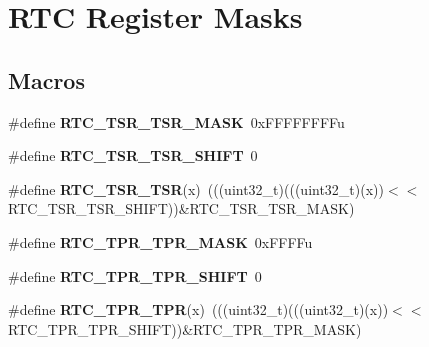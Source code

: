 \hypertarget{group___r_t_c___register___masks}{}\section{R\+TC Register Masks}
\label{group___r_t_c___register___masks}
\subsection*{Macros}
\begin{DoxyCompactItemize}
\item 
\mbox{\label{group___r_t_c___register___masks_ga9a0f8842e8262ca176fcf028982153af}} 
\#define {\bfseries R\+T\+C\+\_\+\+T\+S\+R\+\_\+\+T\+S\+R\+\_\+\+M\+A\+SK}~0x\+F\+F\+F\+F\+F\+F\+F\+Fu
\item 
\mbox{\label{group___r_t_c___register___masks_gad0476d1e39a866b5b5ba4728b55e258a}} 
\#define {\bfseries R\+T\+C\+\_\+\+T\+S\+R\+\_\+\+T\+S\+R\+\_\+\+S\+H\+I\+FT}~0
\item 
\mbox{\label{group___r_t_c___register___masks_ga0265b25e77883b6b0cb056ab697b5bc6}} 
\#define {\bfseries R\+T\+C\+\_\+\+T\+S\+R\+\_\+\+T\+SR}(x)~(((uint32\+\_\+t)(((uint32\+\_\+t)(x))$<$$<$R\+T\+C\+\_\+\+T\+S\+R\+\_\+\+T\+S\+R\+\_\+\+S\+H\+I\+FT))\&R\+T\+C\+\_\+\+T\+S\+R\+\_\+\+T\+S\+R\+\_\+\+M\+A\+SK)
\item 
\mbox{\label{group___r_t_c___register___masks_ga2682f687fa561be2f002fc574d48cc79}} 
\#define {\bfseries R\+T\+C\+\_\+\+T\+P\+R\+\_\+\+T\+P\+R\+\_\+\+M\+A\+SK}~0x\+F\+F\+F\+Fu
\item 
\mbox{\label{group___r_t_c___register___masks_ga624a290f73478b3ca2687ac49cc78fb2}} 
\#define {\bfseries R\+T\+C\+\_\+\+T\+P\+R\+\_\+\+T\+P\+R\+\_\+\+S\+H\+I\+FT}~0
\item 
\mbox{\label{group___r_t_c___register___masks_gac2c160abce9b85ad4d9386f0dd8c31ea}} 
\#define {\bfseries R\+T\+C\+\_\+\+T\+P\+R\+\_\+\+T\+PR}(x)~(((uint32\+\_\+t)(((uint32\+\_\+t)(x))$<$$<$R\+T\+C\+\_\+\+T\+P\+R\+\_\+\+T\+P\+R\+\_\+\+S\+H\+I\+FT))\&R\+T\+C\+\_\+\+T\+P\+R\+\_\+\+T\+P\+R\+\_\+\+M\+A\+SK)

\end{DoxyCompactItemize}
